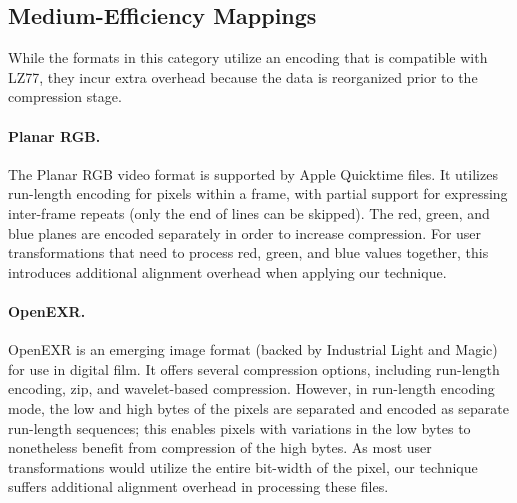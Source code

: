 
\subsection{Medium-Efficiency Mappings}
\label{sec:formats-med}

While the formats in this category utilize an encoding that is
compatible with LZ77, they incur extra overhead because the data is
reorganized prior to the compression stage.

\paragraph{Planar RGB.}
The Planar RGB video format is supported by Apple Quicktime files.  It
utilizes run-length encoding for pixels within a frame, with partial
support for expressing inter-frame repeats (only the end of lines can
be skipped).  The red, green, and blue planes are encoded separately
in order to increase compression.  For user transformations that need
to process red, green, and blue values together, this introduces
additional alignment overhead when applying our technique.

\paragraph{OpenEXR.}
OpenEXR is an emerging image format (backed by Industrial Light and
Magic) for use in digital film.  It offers several compression
options, including run-length encoding, zip, and wavelet-based
compression.  However, in run-length encoding mode, the low and high
bytes of the pixels are separated and encoded as separate run-length
sequences; this enables pixels with variations in the low bytes to
nonetheless benefit from compression of the high bytes.  As most user
transformations would utilize the entire bit-width of the pixel, our
technique suffers additional alignment overhead in processing these
files.

